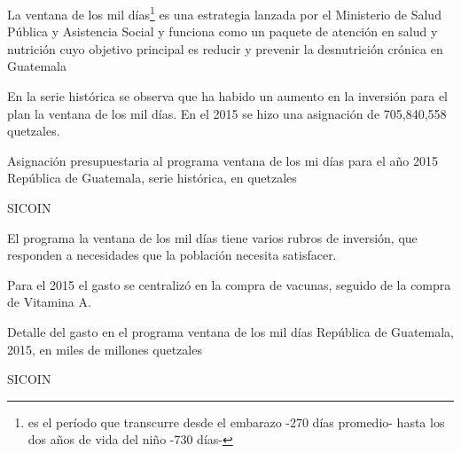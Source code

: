   
  
  {%
  	La ventana de los mil días\footnote{es el período que transcurre desde el embarazo -270 días promedio- hasta los dos años de vida del niño -730 días- } es una estrategia lanzada por el Ministerio de Salud Pública y Asistencia Social y funciona como un paquete de atención en salud y nutrición cuyo objetivo principal es reducir y prevenir la desnutrición crónica en Guatemala
  	
  	En la serie histórica se observa que ha habido un aumento en la inversión para el plan la ventana de los mil días. En el 2015 se hizo una asignación de 705,840,558 quetzales. 
  }%
  {%
  Asignación presupuestaria al programa ventana de los mi días para el año 2015} %
  {%
  	República de Guatemala, serie histórica, en quetzales} %
  {%
  	\begin{tikzpicture}[x=1pt,y=1pt]    \end{tikzpicture}}%
  {%
  	SICOIN} %
  
  
    {%
    	El programa la ventana de los mil días tiene varios rubros de inversión, que responden a necesidades que la población necesita satisfacer.
    	
    	Para el 2015 el gasto se centralizó en la compra de vacunas, seguido de la compra de Vitamina A.
    }%
    {%
    	Detalle del gasto en el programa ventana de los mil días} %
    {%
    	República de Guatemala, 2015, en miles de millones quetzales} %
    {%
    	\begin{tikzpicture}[x=1pt,y=1pt]    \end{tikzpicture}}%
    {%
    	SICOIN} %
  